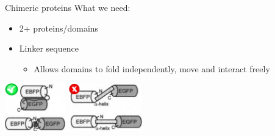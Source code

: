 \documentclass{beamer}
\begin{document}
\begin{frame}{Chimeric proteins}
What we need:
\begin{itemize}
 \item 2+ proteins/domains
 \item Linker sequence
 \begin{itemize}
    \pause
    \item Allows domains to fold independently, move and interact freely
\end{itemize}
\end{itemize}
\vspace{20px}
\pause
\hspace{20px}
\includegraphics[width=100px]{../img/linkerOk-sign.png}
\hspace{40px}
\pause
\includegraphics[width=120px]{../img/linkerBad-sign.png}
\end{frame}



% 
\end{document}
